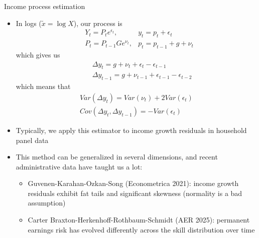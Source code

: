 \documentclass[9pt]{beamer}
\newcommand{\bit}{\begin{itemize}}
\newcommand{\eit}{\end{itemize}}
\begin{document}
\begin{frame}{Income process estimation}

\bit
\setlength\itemsep{0.5em}

\item In logs ($\tilde x = \log X$), our process is
\begin{eqnarray}
& Y_{t} = P_{t} e^{\epsilon_{t}}, & y_{t} = p_{t} + \epsilon_{t}  \nonumber \\
& P_{t} = P_{t-1}G e^{\nu_{t}}, &  p_{t} =  p_{t-1} +  g + \nu_{t} \nonumber 
\end{eqnarray}
which gives us
\begin{eqnarray}
&& \Delta  y_{t} =  g + \nu_{t}  + \epsilon_{t}-\epsilon_{t-1} \nonumber \\
&& \Delta  y_{t-1} =  g + \nu_{t-1}  + \epsilon_{t-1}-\epsilon_{t-2} \nonumber 
\end{eqnarray}
which means that
\begin{eqnarray}
Var(\Delta y_{t}) = Var(\nu_t) + 2Var(\epsilon_{t}) \nonumber \\
Cov(\Delta y_{t}, \Delta y_{t-1}) = -Var(\epsilon_{t}) \nonumber 
\end{eqnarray}

\item Typically, we apply this estimator to income growth residuals in household panel data

\item This method can be generalized in several dimensions, and recent administrative data have taught us a lot:
\bit
	\item Guvenen-Karahan-Ozkan-Song (Econometrica 2021): income growth residuals exhibit fat tails and significant skewness (normality is a bad assumption)

	\item Carter Braxton-Herkenhoff-Rothbaum-Schmidt (AER 2025): permanent earnings risk has evolved differently across the skill distribution over time
\eit

\eit

\end{frame}
\end{document}
